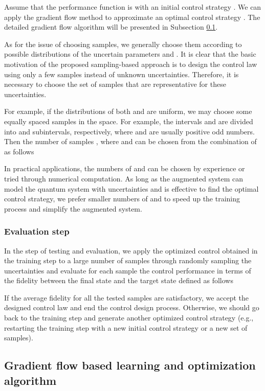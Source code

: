\documentclass[letterpaper, 10 pt, conference]{ieeeconf}
\begin{document}
Assume that the performance function is  with an initial
control strategy . We can apply the
gradient flow method to approximate an optimal control strategy
. The detailed gradient flow algorithm
will be presented in Subsection \ref{sec2.3}.

As for the issue of choosing  samples,
we generally choose them according to possible distributions of the
uncertain parameters  and
. It is clear that the basic
motivation of the proposed sampling-based approach is to design the
control law using only a few samples instead of unknown uncertainties. Therefore, it is
necessary to choose the set of samples that are representative for
these uncertainties.

For example, if the distributions of both  and 
are uniform, we may choose some equally spaced samples in the
 space. For example, the intervals  and  are divided into
 and  subintervals, respectively,
where  and  are usually positive odd
numbers. Then the number of samples ,
where  and  can be chosen from the
combination of  as
follows


In practical applications, the numbers of  and
 can be chosen by experience or tried through
numerical computation. As long as the augmented system can model
the quantum system with uncertainties and is effective to find the optimal control
strategy, we prefer smaller numbers of  and
 to speed up the training process and simplify the
augmented system.

\subsubsection{Evaluation step}
In the step of testing and evaluation, we apply the optimized
control  obtained in the training step to a large number of
samples through randomly sampling the uncertainties
and evaluate for each sample the control performance in terms of
the fidelity  between the final state
 and the target state
 defined as follows \cite{Nielsen
and Chuang 2000}

If the average fidelity for all the
tested samples are satisfactory, we accept the designed control
law and end the control design process. Otherwise, we should go
back to the training step and generate another optimized control
strategy (e.g., restarting the training step with a new initial
control strategy or a new set of samples).

\subsection{Gradient flow based learning and optimization algorithm}
\label{sec2.3}
\end{document}
